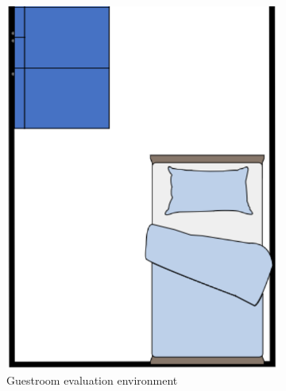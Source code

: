 \begin{figure}[H]
    \centering
    
    \begin{subfigure}{0.35\textwidth}
        \centering
        \includegraphics[width=\linewidth]{figures/Liveroom1.png}
        \caption{Guestroom evaluation environment}
        \label{fig:Liveroom1}
    \end{subfigure}
    \hfill
    \begin{subfigure}{0.35\textwidth}
        \centering

\end{subfigure}
\end{figure}

